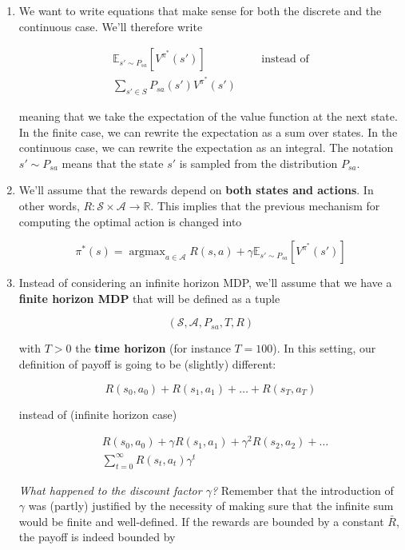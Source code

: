 \documentclass{article}
\begin{document}
\begin{enumerate}
	\item We want to write equations that make sense for both the discrete and the continuous case. We'll therefore write
	
	\begin{align*}
		\mathbb{E}_{s' \sim P_{sa}} \left[ V^{\pi^*} (s')\right] & \ \ \ \ \ \text{ instead of}\\
		\sum_{s' \in S} P_{s a} (s') V^{\pi^*} (s')
	\end{align*}
	
	meaning that we take the expectation of the value function at the next state. In the finite case, we can rewrite the expectation as a sum over states. In the continuous case, we can rewrite the expectation as an integral. The notation $ s' \sim P_{sa} $ means that the state $ s' $ is sampled from the distribution $ P_{sa} $.
	
	\item We'll assume that the rewards depend on \textbf{both states and actions}. In other words, $ R : \mathcal{S} \times \mathcal{A} \rightarrow \mathbb{R} $. This implies that the previous mechanism for computing the optimal action is changed into
	
	\[  \pi^*(s) = \operatorname{argmax}_{a \in \mathcal{A}}  R(s, a) + \gamma  	\mathbb{E}_{s' \sim P_{sa}} \left[ V^{\pi^*} (s')\right] \]
	
	\item Instead of considering an infinite horizon MDP, we'll assume that we have a \textbf{finite horizon MDP} that will be defined as a tuple
	
	\[ \left( \mathcal{S}, \mathcal{A}, P_{sa}, T,  R\right)  \]
	
	with $ T > 0 $  the  \textbf{time horizon} (for instance $ T = 100 $).	In this setting, our definition of payoff is going to be (slightly) different:
	
	\[  R(s_0, a_0) + R(s_1, a_1) + \dots + R(s_T, a_T) \]
	
	instead of (infinite horizon case)
	
	
	\begin{align*}
		&R(s_0, a_0) + \gamma R(s_1, a_1) + \gamma^2 R(s_2, a_2) + \dots\\
		&\sum_{t=0}^{\infty} R(s_t, a_t) \gamma^t
	\end{align*}
	\[  \]
	
	
	\textit{What happened to the discount factor $ \gamma $?} Remember that the introduction of $ \gamma $ was (partly) justified by the necessity of making sure that the infinite sum would be finite and well-defined. If the rewards are bounded by a constant $ \bar{R} $, the payoff is indeed bounded by
	

\end{enumerate}
\end{document}
